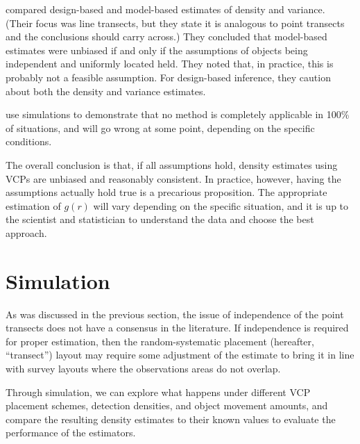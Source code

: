 \documentclass[12pt]{article}
\begin{document}
\textcite{barry2001} compared design-based and  model-based estimates of density and variance. (Their focus was line transects, but they state it is analogous to point transects and the conclusions should carry across.) They concluded that model-based estimates were unbiased if and only if the assumptions of objects being independent and uniformly located held. They noted that, in practice, this is probably not a feasible assumption. For design-based inference, they caution about both the density and variance estimates.

\textcite{roeder1987} use simulations to demonstrate that no method is completely applicable in 100\% of situations, and will go wrong at some point, depending on the specific conditions.

The overall conclusion is that, if all assumptions hold, density estimates using VCPs are unbiased and reasonably consistent. In practice, however, having the assumptions actually hold true is a precarious proposition. The appropriate estimation of $g(r)$ will vary depending on the specific situation, and it is up to the scientist and statistician to understand the data and choose the best approach.

\section{Simulation}
As was discussed in the previous section, the issue of independence of the point transects does not have a consensus in the literature. If independence is required for proper estimation, then the random-systematic placement (hereafter, ``transect'') layout may require some adjustment of the estimate to bring it in line with survey layouts where the observations areas do not overlap.

Through simulation, we can explore what happens under different VCP placement schemes, detection densities, and object movement amounts, and compare the resulting density estimates to their known values to evaluate the performance of the estimators.
\end{document}
